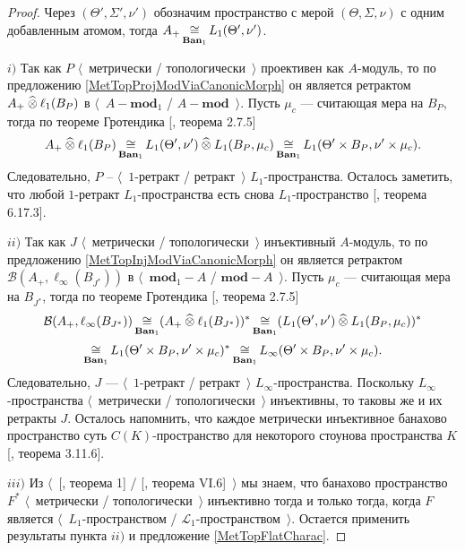 \begin{proof} Через $(\Theta',\Sigma', \nu')$ обозначим пространство с мерой $(\Theta,\Sigma, \nu)$ с одним добавленным атомом, тогда $A_+\mathop{\mathbin{\cong}}\limits_{\mathbf{Ban}_1} L_1(\Theta',\nu')$.

$i)$ Так как $P$ $\langle$~метрически / топологически~$\rangle$ проективен как $A$-модуль, то по предложению \ref{MetTopProjModViaCanonicMorph} он является ретрактом $A_+\mathbin{\widehat{\otimes}} \ell_1(B_P)$ в $\langle$~$A-\mathbf{mod}_1$ / $A-\mathbf{mod}$~$\rangle$. Пусть $\mu_c$ --- считающая мера на $B_P$, тогда по теореме Гротендика [\cite{HelLectAndExOnFuncAn}, теорема 2.7.5]
$$
A_+\mathbin{\widehat{\otimes}}\ell_1(B_P)
\mathop{\mathbin{\cong}}\limits_{\mathbf{Ban}_1}L_1(\Theta',\nu')\mathbin{\widehat{\otimes}} L_1(B_P,\mu_c)
\mathop{\mathbin{\cong}}\limits_{\mathbf{Ban}_1}L_1(\Theta'\times B_P,\nu'\times \mu_c).
$$
Следовательно, $P$ -- $\langle$~$1$-ретракт / ретракт~$\rangle$ $L_1$-пространства. Осталось заметить, что любой $1$-ретракт $L_1$-пространства есть снова $L_1$-пространство [\cite{LaceyIsomThOfClassicBanSp}, теорема 6.17.3].

$ii)$ Так как $J$ $\langle$~метрически / топологически~$\rangle$ инъективный $A$-модуль, то по предложению \ref{MetTopInjModViaCanonicMorph} он является ретрактом $\mathcal{B}(A_+,\ell_\infty(B_{J^*}))$ в $\langle$~$\mathbf{mod}_1-A$ / $\mathbf{mod}-A$~$\rangle$. Пусть $\mu_c$ --- считающая мера на $B_{J^*}$, тогда по теореме Гротендика [\cite{HelLectAndExOnFuncAn}, теорема 2.7.5]
$$
\mathcal{B}(A_+,\ell_\infty(B_{J^*}))
\mathop{\mathbin{\cong}}\limits_{\mathbf{Ban}_1}(A_+\mathbin{\widehat{\otimes}} \ell_1(B_{J^*}))^*
\mathop{\mathbin{\cong}}\limits_{\mathbf{Ban}_1}(L_1(\Theta',\nu')\mathbin{\widehat{\otimes}} L_1(B_P,\mu_c))^*
$$
$$
\mathop{\mathbin{\cong}}\limits_{\mathbf{Ban}_1}L_1(\Theta'\times B_P,\nu'\times \mu_c)^*
\mathop{\mathbin{\cong}}\limits_{\mathbf{Ban}_1}L_\infty(\Theta'\times B_P,\nu'\times \mu_c).
$$
Следовательно, $J$ --- $\langle$~$1$-ретракт / ретракт~$\rangle$ $L_\infty$-пространства. Поскольку $L_\infty$-пространства $\langle$~метрически / топологически~$\rangle$ инъективны, то таковы же и их ретракты $J$. Осталось напомнить, что каждое метрически инъективное банахово пространство суть $C(K)$-пространство для некоторого стоунова пространства $K$ [\cite{LaceyIsomThOfClassicBanSp}, теорема 3.11.6].

$iii)$ Из $\langle$~[\cite{GrothMetrProjFlatBanSp}, теорема 1] / [\cite{StegRethNucOpL1LInfSp}, теорема VI.6]~$\rangle$ мы знаем, что банахово пространство $F^*$ $\langle$~метрически / топологически~$\rangle$ инъективно тогда и только тогда, когда $F$ является $\langle$~$L_1$-пространством / $\mathscr{L}_1$-пространством~$\rangle$. Остается применить результаты пункта $ii)$ и предложение \ref{MetTopFlatCharac}.
\end{proof}

